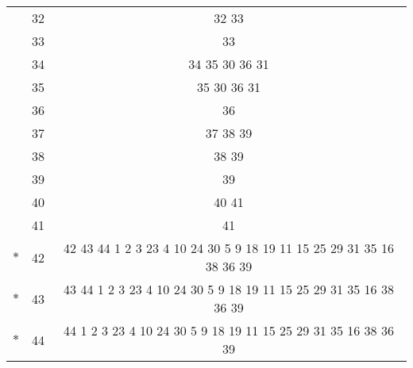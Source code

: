 \begin{tabular}[c]{r|c|c|}
    & 32 & 32 33 \\ \cline{2-3}
    & 33 & 33 \\ \cline{2-3}
    & 34 & 34 35 30 36 31 \\ \cline{2-3}
    & 35 & 35 30 36 31 \\ \cline{2-3}
    & 36 & 36 \\ \cline{2-3}
    & 37 & 37 38 39 \\ \cline{2-3}
    & 38 & 38 39 \\ \cline{2-3}
    & 39 & 39 \\ \cline{2-3}
    & 40 & 40 41 \\ \cline{2-3}
    & 41 & 41 \\ \cline{2-3}
    $*$ & 42 & 42 43 44 1 2 3 23 4 10 24 30 5 9 18 19 11 15 25 29 31 35 16 38 36 39 \\ \cline{2-3}
    $*$ & 43 & 43 44 1 2 3 23 4 10 24 30 5 9 18 19 11 15 25 29 31 35 16 38 36 39 \\ \cline{2-3}
    $*$ & 44 & 44 1 2 3 23 4 10 24 30 5 9 18 19 11 15 25 29 31 35 16 38 36 39 \\ \cline{2-3}
\end{tabular}
